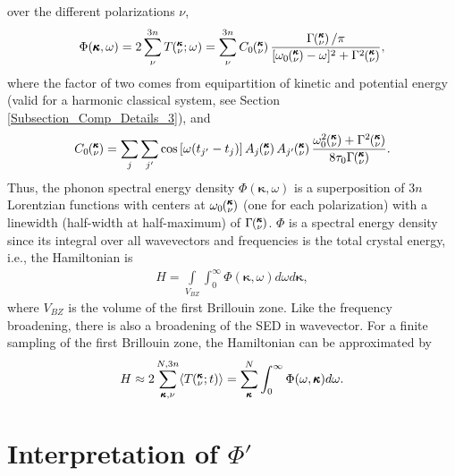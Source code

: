 over the different polarizations $\nu$,
\begin{equation}\label{A:E:Lorentzian_NMD}
\begin{split}
\Phi(\pmb{\kappa},\omega) = 2\sum_{\nu}^{3n} T\kvw=\sum_{\nu}^{3n}C_0\kv
\frac{\Gamma\kv/\pi}{[\omega_0\kv-\omega]^2+\Gamma^2\kv},
\end{split}
\end{equation}
where the factor of two comes from equipartition of kinetic and potential 
energy (valid for a harmonic classical system, see Section 
\ref{Subsection_Comp_Details_3}), and
\begin{equation}\label{A:E:C_0}
\begin{split}
C_0\kv = \sum_j\sum_{j'}\cos\left[\omega (t_{j'}-t_j)\right]A_j\kv A_{j'}
\kv\frac{\omega_0^2\kv+\Gamma^2\kv}{8\tau_0\Gamma\kv}.
\end{split}
\end{equation}
Thus, the phonon spectral energy density $\Phi(\pmb{\kappa},\omega)$ is 
a superposition of $3n$ Lorentzian
functions with centers at $\omega_0\mspace{-4.0mu}\left(\mspace{-8.0mu} \begin{smallmatrix}&\pmb{\kappa} \\&\nu\end{smallmatrix} \mspace{-3.0mu}\right)$ (one for each polarization) with 
a linewidth (half-width at half-maximum) of
$\Gamma\mspace{-4.0mu}\left(\mspace{-8.0mu} \begin{smallmatrix}&\pmb{\kappa} \\&\nu\end{smallmatrix} \mspace{-3.0mu}\right)$. $\Phi$ is a spectral energy density since its integral over 
all wavevectors and frequencies is the total crystal energy, i.e., 
the Hamiltonian is
\begin{equation}\label{A:E:equipartition}
\begin{split}
H=\int\limits_{V_{BZ}} \int_{0}^{\infty}\Phi(\pmb{\kappa},\omega)d\omega 
d\pmb{\kappa},
\end{split}
\end{equation}
where $V_{BZ}$ is the volume of the first Brillouin zone.  Like the 
frequency broadening, there is also a broadening of the SED in wavevector.
\cite{turney_predicting_2009-1} For a finite sampling of the 
first Brillouin zone, 
the Hamiltonian can be approximated by
\begin{equation}\label{A:E:equipartition}
\begin{split}
H \approx 2\sum_{\pmb{\kappa},\nu}^{N,3n}\langle T\mspace{-4.0mu}\left(\mspace{-8.0mu} \begin{smallmatrix}&\pmb{\kappa} \\&\nu\end{smallmatrix} \mspace{-2.0mu};t\right)\rangle = 
\sum_{\pmb{\kappa}}^N \int_{0}^{\infty}\Phi(\omega,\pmb{\kappa})d\omega.
\end{split}
\end{equation}


\section{\label{Appendix_B}Interpretation of $\Phi'$}

